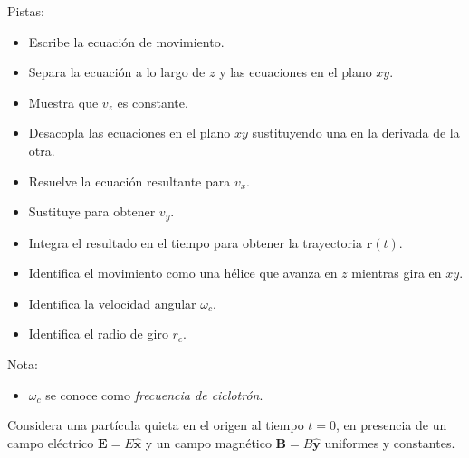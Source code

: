 \documentclass{exam}
\begin{document}
\begin{questions}
    Pistas:
    \begin{itemize}
    \item Escribe la ecuación de movimiento.
    \item Separa la ecuación a lo largo de $z$ y las ecuaciones en el
      plano $xy$.
    \item Muestra que $v_z$ es constante.
    \item Desacopla las ecuaciones en el plano $xy$ sustituyendo una
      en la derivada de la otra.
    \item Resuelve la ecuación resultante para $v_x$.
    \item Sustituye para obtener $v_y$.
    \item Integra el resultado en el tiempo para obtener la
      trayectoria $\bm r(t)$.
    \item Identifica el movimiento como una hélice que avanza en $z$
      mientras gira en $xy$.
    \item Identifica la velocidad angular $\omega_c$.
    \item Identifica el radio de giro $r_c$.
    \end{itemize}
    Nota:
    \begin{itemize}
    \item $\omega_c$ se conoce como {\em frecuencia de ciclotrón}.
    \end{itemize}
  \question Considera una partícula quieta en el origen al tiempo
    $t=0$, en presencia de un campo eléctrico $\bm E=E\hat{\bm x}$ y
    un campo magnético $\bm B=B\hat{\bm y}$ uniformes y constantes.
\end{questions}
\end{document}
